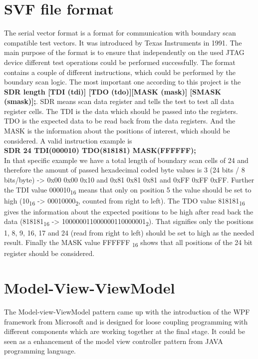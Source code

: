 	\section{SVF file format}
The serial vector format is a format for communication with boundary scan compatible test vectors. It was introduced by Texas Instruments in 1991. The main purpose of the format is to ensure that independently on the used \ac{JTAG} device different test operations could be performed successfully.\cite{.3252021c} The format contains a couple of different instructions, which could be performed by the boundary scan logic. The most important one according to this project is the \newline
\textbf{SDR length [TDI (tdi)] [TDO (tdo)][MASK (mask)] [SMASK (smask)];}. \newline
SDR means scan data register and tells the test to test all data register cells. The TDI is the data which should be passed into the registers.\cite{TEXASINSTRUMENTS.2013} TDO is the expected data to be read back from the data registers. And the MASK is the information about the positions of interest, which should be considered. A valid instruction example is \\ 
\textbf{SDR 24 TDI(000010) TDO(818181) MASK(FFFFFF);} \\
In that specific example we have a total length of boundary scan cells of 24 and therefore the amount of passed hexadecimal coded byte values is 3 (24 bits / 8 bits/byte) -> 0x00 0x00 0x10 and 0x81 0x81 0x81 and 0xFF 0xFF 0xFF. Further the TDI value 000010\textsubscript{16} means that only on position 5 the value should be set to high (10\textsubscript{16} -> 00010000\textsubscript{2}, counted from right to left). The TDO value 818181\textsubscript{16} gives the information about the expected positions to be high after read back the data (818181\textsubscript{16} -> 100000011000000110000001\textsubscript{2}). That signifies only the positions 1, 8, 9, 16, 17 and 24 (read from right to left) should be set to high as the needed result. Finally the MASK value FFFFFF \textsubscript{16} shows that all positions of the 24 bit register should be considered.
	
	\section{Model-View-ViewModel}
The Model-view-ViewModel pattern came up with the introduction of the \ac{WPF} framework from Microsoft and is designed for loose coupling programming with different components which are working together at the final stage. It could be seen as a enhancement of the model view controller pattern from JAVA programming language.\cite{NorbertEder.2010} \\


